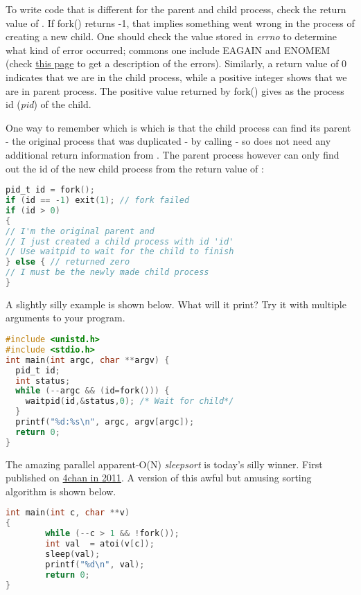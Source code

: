 To write code that is different for the parent and child process, check the return value of . If fork() returns -1, that implies something went wrong in the process of creating a new child. One should check the value stored in \emph{errno} to determine what kind of error occurred; commons one include EAGAIN and ENOMEM (check \href{http://www-numi.fnal.gov/offline_software/srt_public_context/WebDocs/Errors/unix_system_errors.html}{this page} to get a description of the errors). Similarly, a return value of 0 indicates that we are in the child process, while a positive integer shows that we are in parent process. The positive value returned by fork() gives as the process id (\emph{pid}) of the child.

One way to remember which is which is that the child process can find its parent - the original process that was duplicated - by calling  - so does not need any additional return information from . The parent process however can only find out the id of the new child process from the return value of :

\begin{lstlisting}[language=C]
pid_t id = fork();
if (id == -1) exit(1); // fork failed 
if (id > 0)
{ 
// I'm the original parent and 
// I just created a child process with id 'id'
// Use waitpid to wait for the child to finish
} else { // returned zero
// I must be the newly made child process
}
\end{lstlisting}

A slightly silly example is shown below. What will it print? Try it with multiple arguments to your program.

\begin{lstlisting}[language=C]
#include <unistd.h>
#include <stdio.h>
int main(int argc, char **argv) {
  pid_t id;
  int status; 
  while (--argc && (id=fork())) {
    waitpid(id,&status,0); /* Wait for child*/
  }
  printf("%d:%s\n", argc, argv[argc]);
  return 0;
}
\end{lstlisting}

The amazing parallel apparent-O(N) \emph{sleepsort} is today's silly winner. First published on \href{https://dis.4chan.org/read/prog/1295544154}{4chan in 2011}. A version of this awful but amusing sorting algorithm is shown below.

\begin{lstlisting}[language=C]
int main(int c, char **v)
{
        while (--c > 1 && !fork());
        int val  = atoi(v[c]);
        sleep(val);
        printf("%d\n", val);
        return 0;
}
\end{lstlisting}

